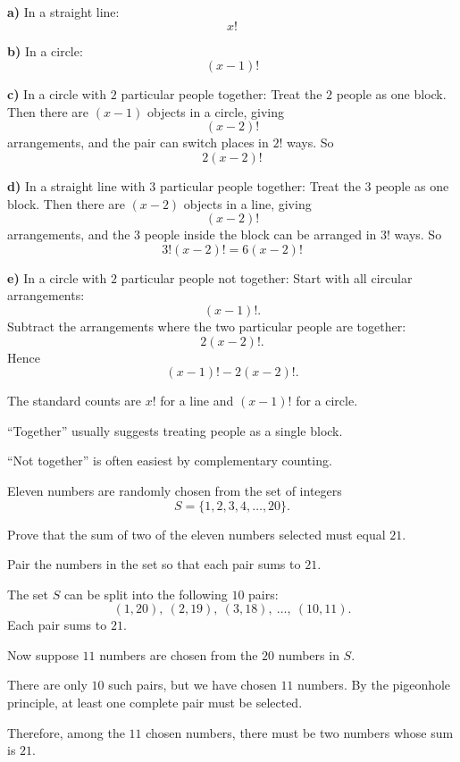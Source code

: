 \begin{solution}
\textbf{a)} In a straight line:
\[
\boxed{x!}
\]

\textbf{b)} In a circle:
\[
\boxed{(x-1)!}
\]

\textbf{c)} In a circle with $2$ particular people together:
Treat the $2$ people as one block. Then there are $(x-1)$ objects in a circle, giving
\[
(x-2)!
\]
arrangements, and the pair can switch places in $2!$ ways. So
\[
\boxed{2(x-2)!}
\]

\textbf{d)} In a straight line with $3$ particular people together:
Treat the $3$ people as one block. Then there are $(x-2)$ objects in a line, giving
\[
(x-2)!
\]
arrangements, and the $3$ people inside the block can be arranged in $3!$ ways. So
\[
\boxed{3!(x-2)! = 6(x-2)!}
\]

\textbf{e)} In a circle with $2$ particular people not together:
Start with all circular arrangements:
\[
(x-1)!.
\]
Subtract the arrangements where the two particular people are together:
\[
2(x-2)!.
\]
Hence
\[
\boxed{(x-1)! - 2(x-2)!}.
\]
\end{solution}

\begin{takeaways}
\item The standard counts are $x!$ for a line and $(x-1)!$ for a circle.
\item ``Together'' usually suggests treating people as a single block.
\item ``Not together'' is often easiest by complementary counting.
\end{takeaways}

\begin{problem}
Eleven numbers are randomly chosen from the set of integers
\[
S=\{1,2,3,4,\dots,20\}.
\]

Prove that the sum of two of the eleven numbers selected must equal $21$.
\end{problem}

\begin{hint}
Pair the numbers in the set so that each pair sums to $21$.
\end{hint}

\begin{solution}
The set $S$ can be split into the following $10$ pairs:
\[
(1,20),\ (2,19),\ (3,18),\ \dots,\ (10,11).
\]
Each pair sums to $21$.

Now suppose $11$ numbers are chosen from the $20$ numbers in $S$.

There are only $10$ such pairs, but we have chosen $11$ numbers. By the pigeonhole principle, at least one complete pair must be selected.

Therefore, among the $11$ chosen numbers, there must be two numbers whose sum is $21$.
\end{solution}

